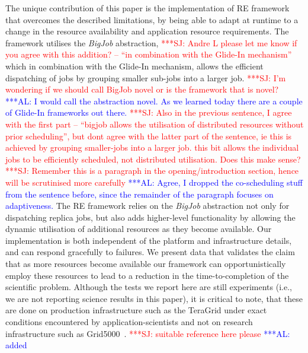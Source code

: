 \documentclass{rspublic}
\newcommand{\alnote}[1]{ {\textcolor{blue} { ***AL: #1 }}}
\newcommand{\jhanote}[1]{ {\textcolor{red} { ***SJ: #1 }}}
\newcommand{\alnote}[1]{}
\newcommand{\jhanote}[1]{}
\begin{document}
The unique contribution of this paper is the implementation of RE
framework that overcomes the described limitations, by being able to
adapt at runtime to a change in the resource availability and
application resource requirements. The framework utilises the
\emph{BigJob} abstraction, \jhanote{Andre L please let me know if you
  agree with this addition? -- ``in combination with the Glide-In
  mechanism''} which in combination with the Glide-In mechanism,
allows the efficient dispatching of jobs by grouping smaller sub-jobs
into a larger job. \jhanote{I'm wondering if we should call BigJob
  novel or is the framework that is
  novel?}  
\alnote{I would call the abstraction novel. As we learned today there
are a couple of Glide-In frameworks out there.} 
\jhanote{Also in the previous sentence, I agree with the first part --
  ``bigjob allows the utilisation of distributed resources without
  prior scheduling'', but dont agree with the latter part of the
  sentence, ie this is achieved by grouping smaller-jobs into a larger
  job. this bit allows the individual jobs to be efficiently
  scheduled, not distributed utilisation. Does this make sense?}
\jhanote{Remember this is a paragraph in the opening/introduction
  section, hence will be scrutinised more carefully} \alnote{Agree, I
  dropped the co-scheduling stuff from the sentence before, since the
  remainder of the paragraph focuses on adaptiveness.}  The RE
framework relies on the \emph{BigJob} abstraction not only for
dispatching replica jobs, but also adds higher-level functionality by
allowing the dynamic utilisation of additional resources as they
become available.  Our implementation is both independent of the
platform and infrastructure details, and can respond gracefully to
failures.  We present data that validates the claim that as more
resources become available our framework can opportunistically employ
these resources to lead to a reduction in the time-to-completion of
the scientific problem.  Although the tests we report here are still
experiments (i.e., we are not reporting science results in this
paper), it is critical to note, that these are done on production
infrastructure such as the TeraGrid under exact conditions encountered
by application-scientists and not on research infrastructure such as
Grid5000~\citep{iosup07}.
\jhanote{suitable reference here please}\alnote{added}
\end{document}
